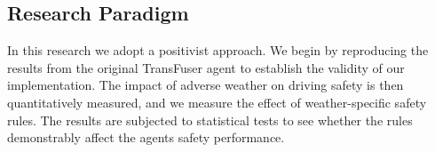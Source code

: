 \subsection*{Research Paradigm}

In this research we adopt a positivist approach.
We begin by reproducing the results from the original TransFuser agent to establish the validity of our implementation.
The impact of adverse weather on driving safety is then quantitatively measured,
and we measure the effect of weather-specific safety rules.
The results are subjected to statistical tests to see whether the rules demonstrably affect the agents safety performance.
